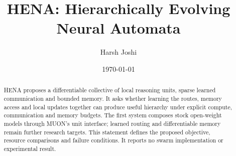 \documentclass[twocolumn]{article}
\title{HENA: Hierarchically Evolving Neural Automata}
\author{Harsh Joshi}
\date{\today}
\begin{document}
\raggedbottom
\maketitle

\begin{abstract}
HENA proposes a differentiable collective of local reasoning units, sparse learned communication and bounded memory. It asks whether learning the routes, memory access and local updates together can produce useful hierarchy under explicit compute, communication and memory budgets. The first system composes stock open-weight models through MUON's unit interface; learned routing and differentiable memory remain further research targets. This statement defines the proposed objective, resource comparisons and failure conditions. It reports no swarm implementation or experimental result.
\end{abstract}





\end{document}
